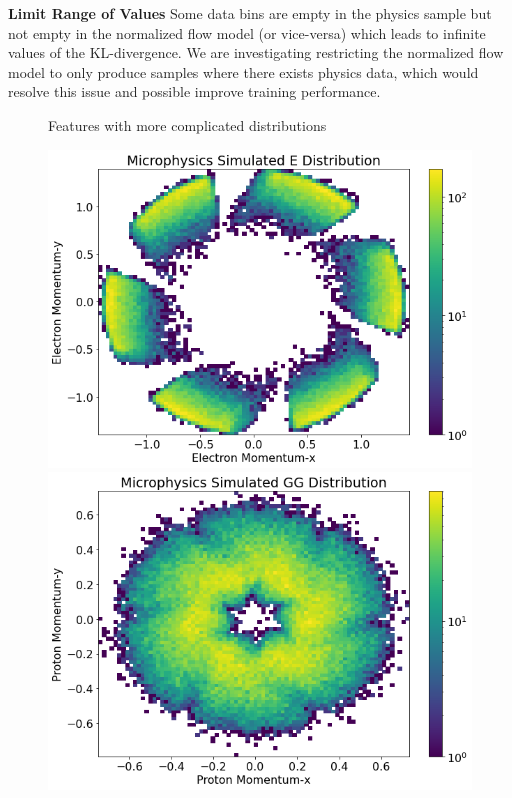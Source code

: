 \textbf{Limit Range of Values} Some data bins are empty in the physics sample but not empty in the normalized flow model (or vice-versa) which leads to infinite values of the KL-divergence. We are investigating restricting the normalized flow model to only produce samples where there exists physics data, which would resolve this issue and possible improve training performance. 

\begin{figure}[!ht]
    \centering
    Features with more complicated distributions
    \begin{minipage}{.4\textwidth}
    
        \centering
        \includegraphics[width=.9\textwidth,trim={0 0 0 .875cm},clip]{pictures/milestoneR2/pxpy/epxpy.png}
        \includegraphics[width=.9\textwidth,trim={0 0 0 .875cm},clip]{pictures/milestoneR2/pxpy/ppxpy.png}
    \end{minipage}%
    \begin{minipage}{0.4\textwidth}
    

\end{minipage}
\end{figure}
